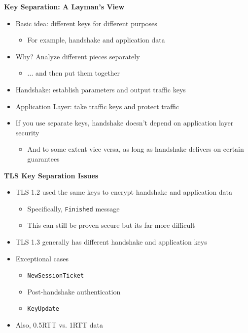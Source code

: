 \documentclass[helvetica]{seminar}
\newcommand{\heading}[1]{%
  \begin{center} 
    \large\bf 
    #1 
  \end{center} 
  \vspace{.4 in}}
\begin{document}
\begin{slide}
\heading{Key Separation: A Layman's View}

\begin{itemize}
\item Basic idea: different keys for different purposes
  \begin{itemize}
  \item For example, handshake and application data
  \end{itemize}

\item Why? Analyze different pieces separately
  \begin{itemize}
  \item ... and then put them together
  \end{itemize}

\item Handshake: establish parameters and output traffic keys
\item Application Layer: take traffic keys and protect traffic
\item If you use separate keys, handshake doesn't depend on application layer security
  \begin{itemize}
  \item And to some extent vice versa, as long as handshake delivers on certain guarantees
  \end{itemize}
\end{itemize}
\end{slide}


\begin{slide}
\heading{TLS Key Separation Issues}

\begin{itemize}
\item TLS 1.2 used the same keys to encrypt handshake and application data
  \begin{itemize}
  \item Specifically, \verb^Finished^ message
  \item This can still be proven secure but its far more difficult
  \end{itemize}

\item TLS 1.3 generally has different handshake and application keys
\item Exceptional cases
  \begin{itemize}
  \item \verb^NewSessionTicket^
  \item Post-handshake authentication
  \item \verb^KeyUpdate^
  \end{itemize}

\item Also, 0.5RTT vs. 1RTT data
\end{itemize}
\end{slide}
\end{document}
